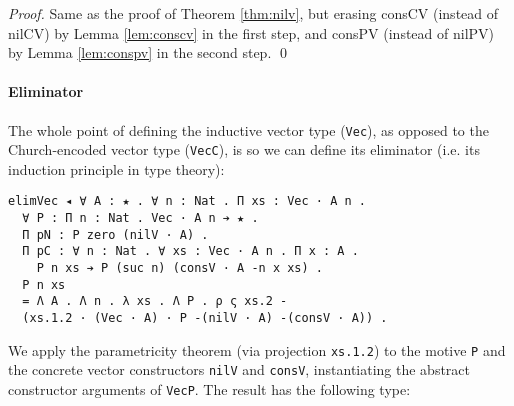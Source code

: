 \documentclass[a4paper,envcountsame,envcountsect]{llncs}
\newcommand{\refthm}[1]{Theorem \ref{thm:#1}}
\newcommand{\reflem}[1]{Lemma \ref{lem:#1}}
\newcommand{\earg}[1]{\,\,#1}
\newcommand{\erase}[1]{\ensuremath{\lvert #1 \rvert}}
\newcommand{\Erase}[1]{\ensuremath{\Big\lvert #1 \Big\rvert}}
\newcommand{\pair}[2]{\ensuremath{[ #1 ~,~ #2]}}
\newcommand{\fun}[1]{\lambda #1 .~}
\newcommand{\by}[1]{\text{#1}}
\newcommand{\name}[1]{\textrm{#1}}
\begin{document}
\begin{proof}
{\small
  Same as the proof of \refthm{nilv}, but erasing
  \name{consCV} (instead of \name{nilCV})
  by \reflem{conscv} in the first step, and
  \name{consPV} (instead of \name{nilPV})
  by \reflem{conspv} in the second step. \qed
}
\end{proof}

\paragraph{Eliminator}

The whole point of defining the inductive vector type (\texttt{Vec}),
as opposed to the Church-encoded vector type (\texttt{VecC}), is so
we can define its eliminator (i.e. its induction principle in type theory):

\begin{verbatim}
elimVec ◂ ∀ A : ★ . ∀ n : Nat . Π xs : Vec · A n .
  ∀ P : Π n : Nat . Vec · A n ➔ ★ .
  Π pN : P zero (nilV · A) .
  Π pC : ∀ n : Nat . ∀ xs : Vec · A n . Π x : A . 
    P n xs ➔ P (suc n) (consV · A -n x xs) .
  P n xs
  = Λ A . Λ n . λ xs . Λ P . ρ ς xs.2 -
  (xs.1.2 · (Vec · A) · P -(nilV · A) -(consV · A)) .
\end{verbatim}

We apply the parametricity theorem (via projection
\texttt{xs.1.2}) to the motive \texttt{P} and the concrete vector
constructors \texttt{nilV} and \texttt{consV}, instantiating the
abstract constructor arguments of \texttt{VecP}. The result has the
following type:
\end{document}
